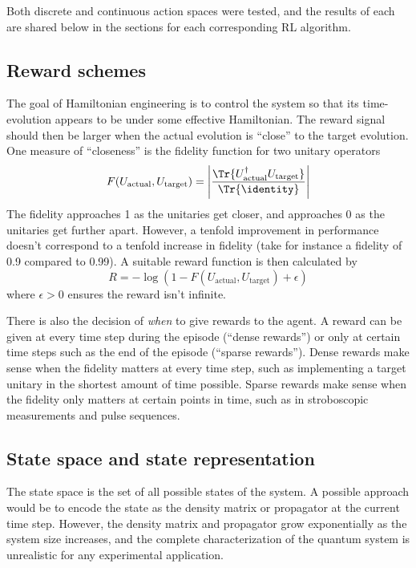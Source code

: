 \documentclass[twocolumn, aps, 10pt]{revtex4-2}
\begin{document}
Both discrete and continuous action spaces were tested, and the results of each are shared below in the sections for each corresponding RL algorithm.

\subsection{Reward schemes}

The goal of Hamiltonian engineering is to control the system so that its time-evolution appears to be under some effective Hamiltonian. The reward signal should then be larger when the actual evolution is ``close'' to the target evolution. One measure of ``closeness'' is the fidelity function for two unitary operators
\begin{equation} %
    F(U_\text{actual}, U_\text{target}) = \left| \frac{\Tr{
        U_\text{actual}^\dagger U_\text{target}
    }}{\Tr{\identity}} \right|
\end{equation}
The fidelity approaches 1 as the unitaries get closer, and approaches 0 as the unitaries get further apart. However, a tenfold improvement in performance doesn't correspond to a tenfold increase in fidelity (take for instance a fidelity of 0.9 compared to 0.99). A suitable reward function is then calculated by
\begin{equation}
    R = -\log(1-F(U_\text{actual}, U_\text{target}) + \epsilon)
\end{equation}
where $\epsilon>0$ ensures the reward isn't infinite.

There is also the decision of \emph{when} to give rewards to the agent. A reward can be given at every time step during the episode (``dense rewards'') or only at certain time steps such as the end of the episode (``sparse rewards'').
Dense rewards make sense when the fidelity matters at every time step, such as implementing a target unitary in the shortest amount of time possible.
Sparse rewards make sense when the fidelity only matters at certain points in time, such as in stroboscopic measurements and pulse sequences.

\subsection{State space and state representation}

The state space is the set of all possible states of the system. A possible approach would be to encode the state as the density matrix or propagator at the current time step. However, the density matrix and propagator grow exponentially as the system size increases, and the complete characterization of the quantum system is unrealistic for any experimental application.
\end{document}
